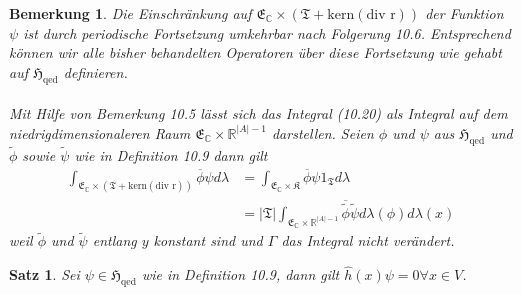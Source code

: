 \documentclass[11pt,a4paper,leqno]{report}
\newtheorem{proposition}{Satz}[chapter]
\newtheorem{remark}[theorem]{Bemerkung}
\numberwithin{equation}{chapter}
\begin{document}
\begin{remark}
	Die Einschr\"ankung auf $\mathfrak{E}_{\mathbb{C}}\times(\mathfrak{T}+\text{kern}(\text{div r}))$ der Funktion $\psi$ ist durch periodische Fortsetzung umkehrbar nach Folgerung 10.6. Entsprechend k\"onnen wir alle bisher behandelten Operatoren \"uber diese Fortsetzung wie gehabt auf $\mathfrak{H}_{\text{qed}}$ definieren.\\
	\\
	Mit Hilfe von Bemerkung 10.5 l\"asst sich das Integral (10.20) als Integral auf dem niedrigdimensionaleren Raum $\mathfrak{E}_\mathbb{C}\times\mathbb{R}^{|A|-1}$ darstellen. Seien $\phi$ und $\psi$ aus $\mathfrak{H}_{\text{qed}}$ und $\tilde{\phi}$ sowie $\tilde{\psi}$ wie in Definition 10.9 dann gilt 
	\begin{align*}
		\int_{\mathfrak{E}_{\mathbb{C}}\times(\mathfrak{T}+\text{kern}(\text{div r}))}\overline{\phi}\psi d\lambda&= \int_{\mathfrak{E}_{\mathbb{C}}\times\mathfrak{K}}\overline{\phi}\psi 1_{\mathfrak{T}} d\lambda \\ &= |\mathfrak{T}|\int_{\mathfrak{E}_{\mathbb{C}}\times \mathbb{R}^{|A| - 1}} \overline{\tilde{\phi}}\tilde{\psi} d\lambda(\phi)d\lambda(x)
	\end{align*}
	weil $\tilde{\phi}$ und $\tilde{\psi}$ entlang $y$ konstant sind und $\Gamma$ das Integral nicht ver\"andert.
\end{remark}
\noindent
\begin{proposition}
	Sei $\psi\in\mathfrak{H}_{\text{qed}}$ wie in Definition 10.9, dann gilt 
	$\hat{h}(x)\psi=0\forall x\in V$.
\end{proposition}
\end{document}
